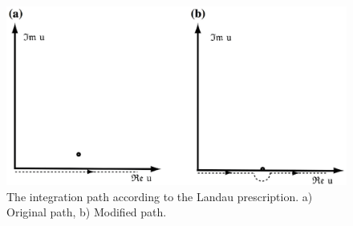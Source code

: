 \documentclass[12pt,a4paper]{article}
\begin{document}
\begin{figure}
\centering
\includegraphics[height=8.cm, angle=0]{landau_prescrip.eps}
\caption{
The integration path according to the Landau prescription. a) Original path, b) Modified path.
}
\label{fig:landau}
\end{figure}
\end{document}
